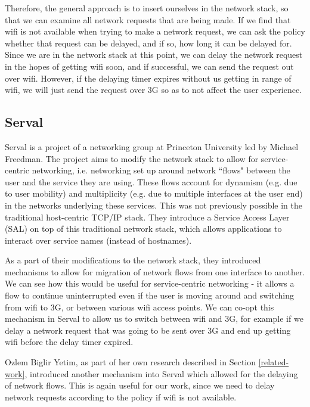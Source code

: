 \documentclass[12pt, fleqn]{article}
\begin{document}
Therefore, the general approach is to insert ourselves in the network stack, so 
that we can examine all network requests that are being made. If we find that 
wifi is not available when trying to make a network request, we can ask the 
policy whether that request can be delayed, and if so, how long it can be 
delayed for. Since we are in the network stack at this point, we can  
delay the network request in the hopes of getting wifi soon, and if successful, 
we can send the request out over wifi. However, if the delaying timer expires 
without us getting in range of wifi, we will just send the request over 3G so as 
to not affect the user experience. 

\subsection{Serval}
\label{mechanism-serval}

Serval is a project of a networking group at Princeton University led by Michael 
Freedman. The project aims to modify the network stack to allow for 
service-centric networking, i.e. networking set up around network ``flows" 
between the user and the service they are using. These flows account for 
dynamism (e.g. due to user mobility) and multiplicity (e.g. due to multiple interfaces at the user end)
in the networks underlying these services. This was not previously possible in 
the traditional host-centric TCP/IP stack. They introduce a Service Access Layer 
(SAL) on top of this traditional network stack, which allows applications to 
interact over service names (instead of hostnames). 

As a part of their modifications to the network stack, they introduced 
mechanisms to allow for migration of network flows from one interface to 
another. We can see how this would be useful for service-centric networking - it 
allows a flow to continue uninterrupted even if the user is moving around and 
switching from wifi to 3G, or between various wifi access points. We can co-opt 
this mechanism in Serval to allow us to switch between wifi and 3G, for example 
if we delay a network request that was going to be sent over 3G and end up getting
wifi before the delay timer expired.

Ozlem Biglir Yetim, as part of her own research described in Section \ref{related-work}, 
introduced another mechanism into Serval which allowed for the delaying of 
network flows. This is again useful for our work, since we need to delay network 
requests according to the policy if wifi is not available.
\end{document}

